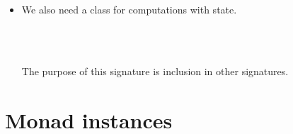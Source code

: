 \documentclass{beamer}
\begin{document}
\begin{itemize}
  {}{}{\hlopt{(}}{}{\hlopt{:
  }}{}{\hlopt{) :}}{\hlendline{}}\\
  {}{\hlendline{}}\\
  {\hlstd{ \ }}{}{}{\hlendline{}}\\
  {\hlstd{ \ }}{}{}{\hlopt{: }}{}{\hlopt{-> }}{}{}{}{}{\hlendline{}}\\
  {}{\hlopt{= }}{}{\hlendline{}}\\
  {\hlstd{ \ }}{}{}{\hlendline{}}\\
  {\hlstd{ \ }}{}{}{\hlopt{(}}{}{\hlopt{)}}{\hlendline{}}\\
  {}{\hlendline{}}\\
  
  
  \item We also need a class for computations with state.
  
  {}{}{\hlopt{=
  }}{}{\hlendline{}}\\
  {\hlstd{ \ }}{}{}{}{}{}{}{\hlopt{: }}{}{}{}{\hlopt{: }}{}{\hlopt{->
  }}{}{}{\hlendline{}}\\
  {}{\hlendline{}}
  
  The purpose of this signature is inclusion in other signatures.
\end{itemize}

\section{Monad instances}
\end{document}
